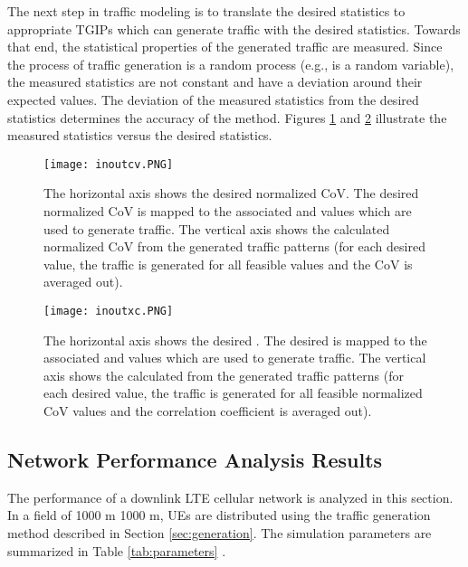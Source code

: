 \documentclass[journal]{IEEEtran}
\begin{document}
The next step in traffic modeling is to translate the desired statistics to appropriate TGIPs which can generate traffic with the desired statistics. Towards that end, the statistical properties of the generated traffic are measured. Since the process of traffic generation is a random process (e.g.,  is a random variable), the measured statistics are not constant and have a deviation around their expected values. The deviation of the measured statistics from the desired statistics determines the accuracy of the method. Figures \ref{fig:inoutcv} and \ref{fig:inoutxc} illustrate the measured statistics versus the desired statistics.

\begin{figure}
\centering
\texttt{[image: inoutcv.PNG]}
\caption{The horizontal axis shows the desired normalized CoV. The desired normalized CoV is mapped to the associated  and  values which are used to generate traffic. The vertical axis shows the calculated normalized CoV from the generated traffic patterns (for each desired  value, the traffic is generated for all feasible  values and the CoV is averaged out).}
\label{fig:inoutcv}
\end{figure}

\begin{figure}
\centering
\texttt{[image: inoutxc.PNG]}
\caption{The horizontal axis shows the desired . The desired  is mapped to the associated  and  values which are used to generate traffic. The vertical axis shows the calculated  from the generated traffic patterns (for each desired  value, the traffic is generated for all feasible normalized CoV values and the correlation coefficient is averaged out).}
\label{fig:inoutxc}
\end{figure}

\subsection{Network Performance Analysis Results}
\label{subsec:performanceresults}

The performance of a downlink LTE cellular network is analyzed in this section. In a field of 1000 m  1000 m, UEs are distributed using the traffic generation method described in Section \ref{sec:generation}. The simulation parameters are summarized in Table \ref{tab:parameters} \cite{ICT10WINNER,DBNRS_PIMRC10}.
\end{document}
